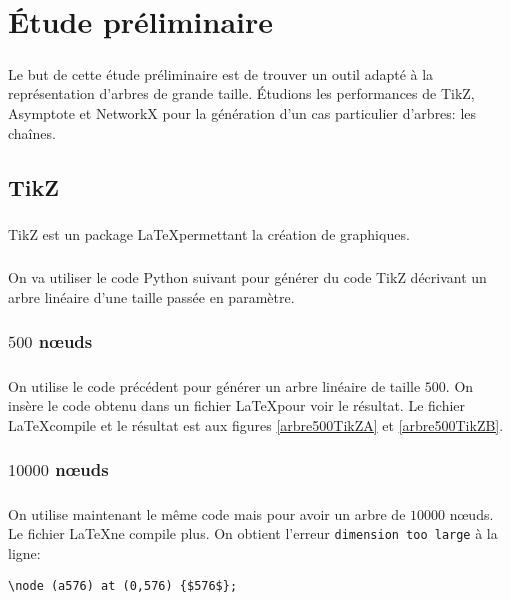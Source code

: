 \chapter{Étude préliminaire}

\paragraph{}Le but de cette étude préliminaire est de trouver un outil adapté à la représentation d'arbres de grande taille. Étudions les performances de TikZ, Asymptote et NetworkX pour la génération d'un cas particulier d'arbres: les chaînes.

	\section{TikZ}

\paragraph{}TikZ est un package \LaTeX permettant la création de graphiques.

\paragraph{}On va utiliser le code Python suivant pour générer du code TikZ décrivant un arbre linéaire d'une taille passée en paramètre.


		\subsection{$500$ n\oe uds}

\paragraph{}On utilise le code précédent pour générer un arbre linéaire de taille $500$. On insère le code obtenu dans un fichier \LaTeX pour voir le résultat. Le fichier \LaTeX compile et le résultat est aux figures \ref{arbre500TikZA} et \ref{arbre500TikZB}.

		\subsection{$10000$ n\oe uds}
		
\paragraph{}On utilise maintenant le même code mais pour avoir un arbre de $10000$ n\oe uds. Le fichier \LaTeX ne compile plus. On obtient l'erreur \verb|dimension too large| à la ligne:
\begin{lstlisting}
\node (a576) at (0,576) {$576$};
\end{lstlisting}

